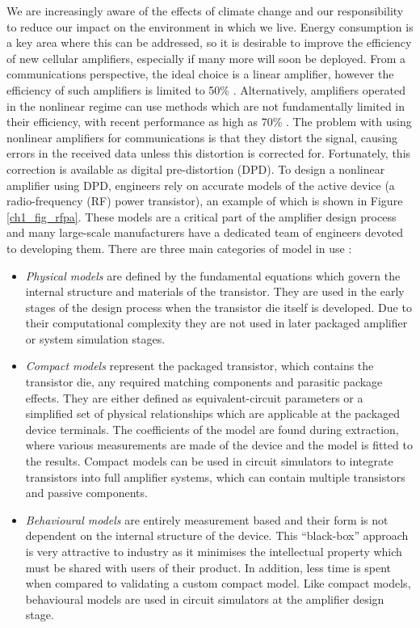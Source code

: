 \documentclass[../thesis/thesis.tex]{subfiles}
\begin{document}
We are increasingly aware of the effects of climate change and our responsibility to reduce our impact on the environment in which we live. Energy consumption is a key area where this can be addressed, so it is desirable to improve the efficiency of new cellular amplifiers, especially if many more will soon be deployed. From a communications perspective, the ideal choice is a linear amplifier, however the efficiency of such amplifiers is limited to 50\% \cite{Cripps_2006}. Alternatively, amplifiers operated in the nonlinear regime can use methods which are not fundamentally limited in their efficiency, with recent performance as high as 70\% \cite{Kosaka_2016,Bhardwaj_2019}. The problem with using nonlinear amplifiers for communications is that they distort the signal, causing errors in the received data unless this distortion is corrected for. Fortunately, this correction is available as digital pre-distortion (DPD). To design a nonlinear amplifier using DPD, engineers rely on accurate models of the active device (a radio-frequency (RF) power transistor), an example of which is shown in Figure \ref{ch1_fig_rfpa}. These models are a critical part of the amplifier design process and many large-scale manufacturers have a dedicated team of engineers devoted to developing them. There are three main categories of model in use \cite{Aaen_2007}:

\begin{itemize}
	\item \emph{Physical models} are defined by the fundamental equations which govern the internal structure and materials of the transistor. They are used in the early stages of the design process when the transistor die itself is developed. Due to their computational complexity they are not used in later packaged amplifier or system simulation stages.
	\item \emph{Compact models} represent the packaged transistor, which contains the transistor die, any required matching components and parasitic package effects. They are either defined as equivalent-circuit parameters or a simplified set of physical relationships which are applicable at the packaged device terminals. The coefficients of the model are found during extraction, where various measurements are made of the device and the model is fitted to the results. Compact models can be used in circuit simulators to integrate transistors into full amplifier systems, which can contain multiple transistors and passive components.
	\item \emph{Behavioural models} are entirely measurement based and their form is not dependent on the internal structure of the device. This ``black-box'' approach is very attractive to industry as it minimises the intellectual property which must be shared with users of their product. In addition, less time is spent when compared to validating a custom compact model. Like compact models, behavioural models are used in circuit simulators at the amplifier design stage.
\end{itemize}
\end{document}
